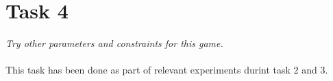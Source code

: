 \section{Task 4}
\label{sec:task4}
\textit{Try other parameters and constraints for this game.}\\\\
This task has been done as part of relevant experiments durint task 2 and 3.